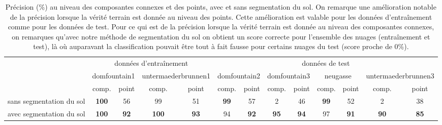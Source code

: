 \begin{table}[p]
\tiny
\begin{tabular}{l|c|c|c|c|c|c|c|c|c|c|c|c|}
\cline{2-13}
                                               & \multicolumn{4}{c|}{données d'entraînement}                                  & \multicolumn{8}{c|}{données de test}                                                                                                             \\ \cline{2-13} 
                                               & \multicolumn{2}{c|}{domfountain1} & \multicolumn{2}{c|}{untermaederbrunnen1} & \multicolumn{2}{c|}{domfountain2} & \multicolumn{2}{c|}{domfountain3} & \multicolumn{2}{c|}{neugasse} & \multicolumn{2}{c|}{untermaederbrunnen3} \\ \cline{2-13} 
                                               & comp.            & point          & comp.               & point              & comp.           & point           & comp.           & point           & comp.         & point         & comp.               & point              \\ \hline
\multicolumn{1}{|l|}{sans segmentation du sol} & \textbf{100}     & 56             & 99                  & 51                 & \textbf{99}     & 57              & 2               & 46              & \textbf{99}   & 52            & 2                   & 38                 \\ \hline
\multicolumn{1}{|l|}{avec segmentation du sol} & \textbf{100}     & \textbf{92}    & \textbf{100}        & \textbf{93}        & 94              & \textbf{92}     & \textbf{95}     & \textbf{94}     & 97            & \textbf{91}   & \textbf{90}         & \textbf{85}        \\ \hline
\end{tabular}
\caption{Précision (\%) au niveau des composantes connexes et des points, avec et sans segmentation du sol. On remarque une amélioration notable de la précision lorsque la vérité terrain est donnée au niveau des points. Cette amélioration est valable pour les données d'entraînement comme pour les données de test. Pour ce qui est de la précision lorsque la vérité terrain est donnée au niveau des composantes connexes, on remarques qu'avec notre méthode de segmentation du sol on obtient un score correcte pour l'ensemble des nuages (entraînement et test), là où auparavant la classification pouvait être tout à fait fausse pour certains nuages du test (score proche de $0$\%).}
\label{table:ground}
\end{table}